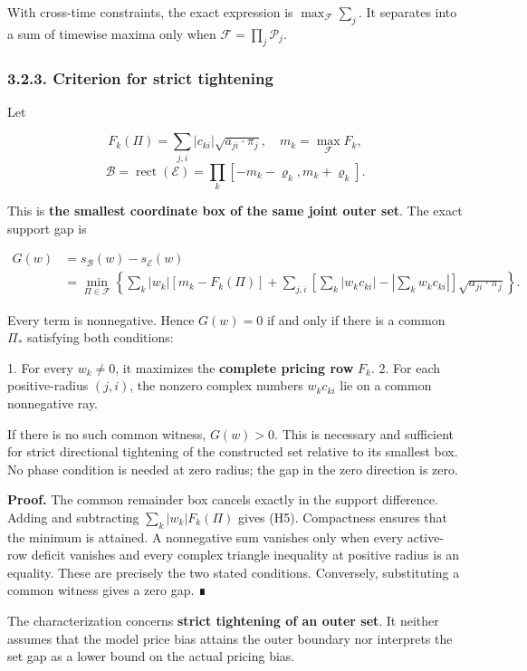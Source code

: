 \documentclass[a4paper,11pt]{article}
\begin{document}
With cross-time constraints, the exact expression is $\max_{\mathcal F}\sum_j$. It separates into a sum of timewise maxima only when $\mathcal F=\prod_j\mathcal P_j$.

\subsubsection*{3.2.3. Criterion for strict tightening}

Let

\[
F_k(\Pi)=\sum_{j,i}|c_{ki}|\sqrt{a_{ji}\cdot\pi_j},
\quad m_k=\max_{\mathcal F}F_k,
\]
\[
\mathcal B=\operatorname{rect}(\mathcal E)
=\prod_k[-m_k-\varrho_k,m_k+\varrho_k].
\]

This is \textbf{the smallest coordinate box of the same joint outer set}. The exact support gap is

\[
\begin{aligned}
G(w)&=s_{\mathcal B}(w)-s_{\mathcal E}(w)\\
&=\min_{\Pi\in\mathcal F}\left\{
\sum_k|w_k|[m_k-F_k(\Pi)]
+\sum_{j,i}\left[
\sum_k|w_kc_{ki}|-\left|\sum_kw_kc_{ki}\right|
\right]\sqrt{a_{ji}\cdot\pi_j}\right\}.
\end{aligned}
\tag{H5}
\]

Every term is nonnegative. Hence $G(w)=0$ if and only if there is a common $\Pi_*$ satisfying both conditions:

1. For every $w_k\ne0$, it maximizes the \textbf{complete pricing row} $F_k$.
2. For each positive-radius $(j,i)$, the nonzero complex numbers $w_kc_{ki}$ lie on a common nonnegative ray.

If there is no such common witness, $G(w)>0$. This is necessary and sufficient for strict directional tightening of the constructed set relative to its smallest box. No phase condition is needed at zero radius; the gap in the zero direction is zero.

\textbf{Proof.} The common remainder box cancels exactly in the support difference. Adding and subtracting $\sum_k|w_k|F_k(\Pi)$ gives (H5). Compactness ensures that the minimum is attained. A nonnegative sum vanishes only when every active-row deficit vanishes and every complex triangle inequality at positive radius is an equality. These are precisely the two stated conditions. Conversely, substituting a common witness gives a zero gap. ∎

The characterization concerns \textbf{strict tightening of an outer set}. It neither assumes that the model price bias attains the outer boundary nor interprets the set gap as a lower bound on the actual pricing bias.
\end{document}
